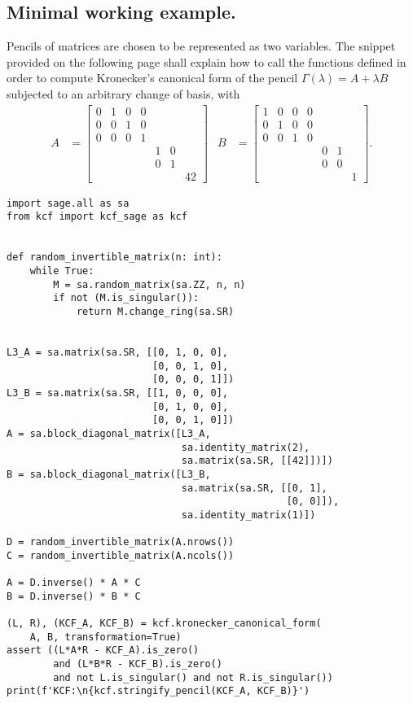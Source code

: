 \subsection*{Minimal working example.}
Pencils of matrices are chosen to be represented as two variables. The snippet provided on the following page
shall explain how to call the functions defined in order to compute Kronecker's canonical form of the pencil
\(\Gamma(\lambda) = A + \lambda B\) subjected to an arbitrary change of basis, with
\begin{align*}
    A &=
    \begin{bmatrix}
        0 & 1 & 0 & 0 \\
        0 & 0 & 1 & 0 \\
        0 & 0 & 0 & 1 \\
        & & & & 1 & 0 \\
        & & & & 0 & 1 \\
        & & & & & & 42
    \end{bmatrix} &
    B &=
    \begin{bmatrix}
        1 & 0 & 0 & 0 \\
        0 & 1 & 0 & 0 \\
        0 & 0 & 1 & 0 \\
        & & & & 0 & 1 \\
        & & & & 0 & 0 \\
        & & & & & & 1
    \end{bmatrix}.
\end{align*}
\pagebreak
\begin{verbatim}
import sage.all as sa
from kcf import kcf_sage as kcf


def random_invertible_matrix(n: int):
    while True:
        M = sa.random_matrix(sa.ZZ, n, n)
        if not (M.is_singular()):
            return M.change_ring(sa.SR)


L3_A = sa.matrix(sa.SR, [[0, 1, 0, 0],
                         [0, 0, 1, 0],
                         [0, 0, 0, 1]])
L3_B = sa.matrix(sa.SR, [[1, 0, 0, 0],
                         [0, 1, 0, 0],
                         [0, 0, 1, 0]])
A = sa.block_diagonal_matrix([L3_A,
                              sa.identity_matrix(2),
                              sa.matrix(sa.SR, [[42]])])
B = sa.block_diagonal_matrix([L3_B,
                              sa.matrix(sa.SR, [[0, 1],
                                                [0, 0]]),
                              sa.identity_matrix(1)])

D = random_invertible_matrix(A.nrows())
C = random_invertible_matrix(A.ncols())

A = D.inverse() * A * C
B = D.inverse() * B * C

(L, R), (KCF_A, KCF_B) = kcf.kronecker_canonical_form(
    A, B, transformation=True)
assert ((L*A*R - KCF_A).is_zero()
        and (L*B*R - KCF_B).is_zero()
        and not L.is_singular() and not R.is_singular())
print(f'KCF:\n{kcf.stringify_pencil(KCF_A, KCF_B)}')
\end{verbatim}